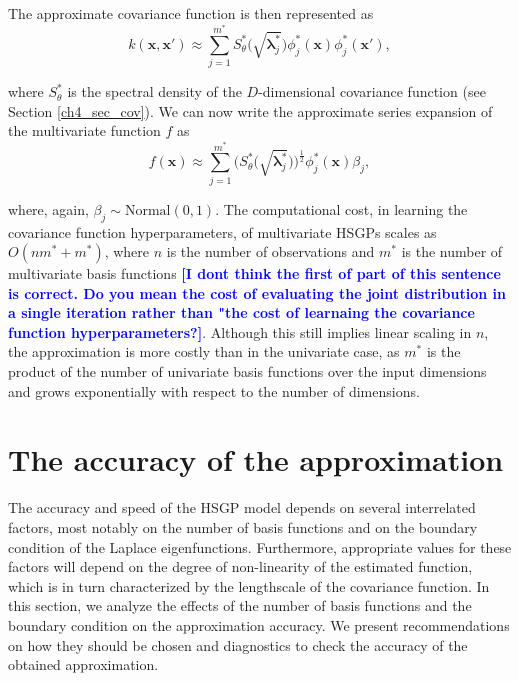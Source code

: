 \documentclass[onecolumn,a4paper,11pt]{article}
\newcommand{\todo}[1]{\textcolor{blue}{\textbf{[#1]}}}
\begin{document}
\noindent The approximate covariance function is then represented as
%
\begin{equation}\label{eq_approxcov_multi}
k(\bm{x},\bm{x}') \approx \sum_{j=1}^{m^{\ast}} 
S^{\ast}_{\theta}\big(\sqrt{\bm{\lambda}^{\ast}_j}\big)
\phi^{\ast}_j(\bm{x}) \phi^{\ast}_j(\bm{x}'),
\end{equation}

\noindent where $S^{\ast}_{\theta}$ is the spectral density of the $D$-dimensional covariance function (see Section \ref{ch4_sec_cov}). We can now write the approximate series expansion of the multivariate function $f$ as
%
\begin{equation}\label{eq_approxf_multi}
f(\bm{x}) \approx \sum_{j=1}^{m^{\ast}} 
\big( S^{\ast}_{\theta} \big(\sqrt{\bm{\lambda}^{\ast}_j} \big)\big)^{\! \frac{1}{2}} \phi^{\ast}_j(\bm{x}) \beta_j, 
\end{equation}

\noindent where, again, $\beta_j \sim \text{Normal}(0,1)$. The computational cost, in learning the covariance function hyperparameters, of multivariate HSGPs scales as $O(n m^{\ast} + m^{\ast})$, where $n$ is the number of observations and $m^{\ast}$ is the number of multivariate basis functions \todo{I dont think the first of part of this sentence is correct. Do you mean the cost of evaluating the joint distribution in a single iteration rather than "the cost of learnaing the covariance function hyperparameters?}. Although this still implies linear scaling in $n$, the approximation is more costly than in the univariate case, as $m^{\ast}$ is the product of the number of univariate basis functions over the input dimensions and grows exponentially with respect to the number of  dimensions.


\section{The accuracy of the approximation}\label{ch5_sec_accuracy}

The accuracy and speed of the HSGP model depends on several interrelated factors, most notably on the number of basis functions and on the boundary condition of the Laplace eigenfunctions. Furthermore, appropriate values for these factors will depend on the degree of non-linearity of the estimated function, which is in turn characterized by the lengthscale of the covariance function.
In this section, we analyze the effects of the number of basis functions and the boundary condition on the approximation accuracy. We present recommendations on how they should be chosen and diagnostics to check the accuracy of the obtained approximation. 
\end{document}
